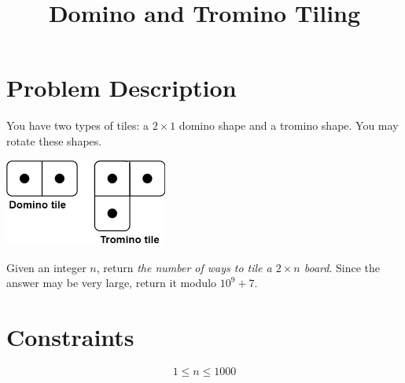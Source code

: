 \documentclass{article}
\title{Domino and Tromino Tiling}
\author{}
\date{}
\begin{document}
\maketitle

\section*{Problem Description}

You have two types of tiles: a $2 \times 1$ domino shape and a tromino shape. You may rotate these shapes.

\begin{center}
    \includegraphics[width=0.4\textwidth]{lc-domino.jpg}
\end{center}

Given an integer $n$, return \emph{the number of ways to tile a $2 \times n$ board}. Since the answer may be very large, return it modulo $10^9 + 7$.

\section*{Constraints}

\[
1 \leq n \leq 1000
\]
\end{document}
